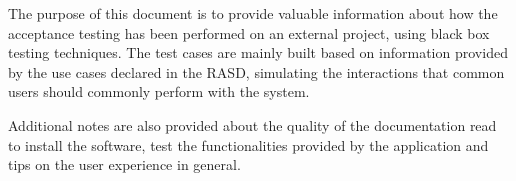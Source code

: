 The purpose of this document is to provide valuable information about how the acceptance testing has been performed on an external project, using black box testing techniques. The test cases are mainly built based on information provided by the use cases declared in the RASD, simulating the interactions that common users should commonly perform with the system.

Additional notes are also provided about the quality of the documentation read to install the software, test the functionalities provided by the application and tips on the user experience in general.